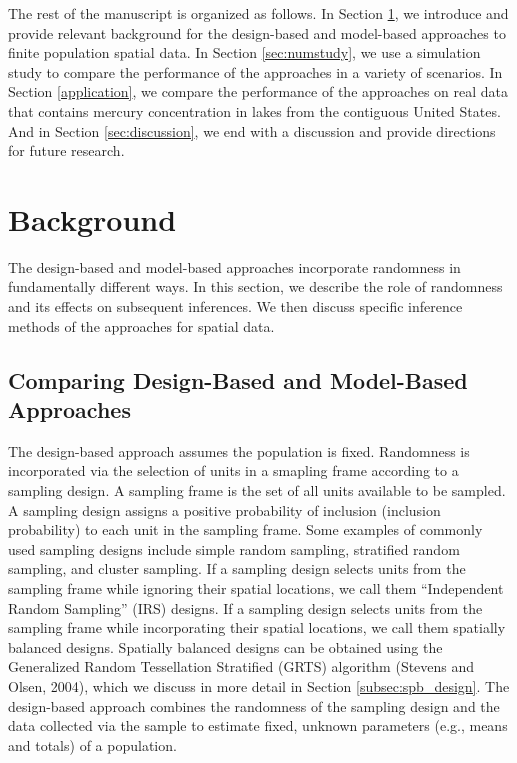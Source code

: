 \documentclass[]{elsarticle} %
\begin{document}
The rest of the manuscript is organized as follows. In Section
\ref{sec:background}, we introduce and provide relevant background for
the design-based and model-based approaches to finite population spatial
data. In Section \ref{sec:numstudy}, we use a simulation study to
compare the performance of the approaches in a variety of scenarios. In
Section \ref{application}, we compare the performance of the approaches
on real data that contains mercury concentration in lakes from the
contiguous United States. And in Section \ref{sec:discussion}, we end
with a discussion and provide directions for future research.

\hypertarget{sec:background}{%
\section{Background}\label{sec:background}}

The design-based and model-based approaches incorporate randomness in
fundamentally different ways. In this section, we describe the role of
randomness and its effects on subsequent inferences. We then discuss
specific inference methods of the approaches for spatial data.

\hypertarget{subsec:dvm_compare}{%
\subsection{Comparing Design-Based and Model-Based
Approaches}\label{subsec:dvm_compare}}

The design-based approach assumes the population is fixed. Randomness is
incorporated via the selection of units in a smapling frame according to
a sampling design. A sampling frame is the set of all units available to
be sampled. A sampling design assigns a positive probability of
inclusion (inclusion probability) to each unit in the sampling frame.
Some examples of commonly used sampling designs include simple random
sampling, stratified random sampling, and cluster sampling. If a
sampling design selects units from the sampling frame while ignoring
their spatial locations, we call them ``Independent Random Sampling''
(IRS) designs. If a sampling design selects units from the sampling
frame while incorporating their spatial locations, we call them
spatially balanced designs. Spatially balanced designs can be obtained
using the Generalized Random Tessellation Stratified (GRTS) algorithm
(Stevens and Olsen, 2004), which we discuss in more detail in Section
\ref{subsec:spb_design}. The design-based approach combines the
randomness of the sampling design and the data collected via the sample
to estimate fixed, unknown parameters (e.g., means and totals) of a
population.
\end{document}
